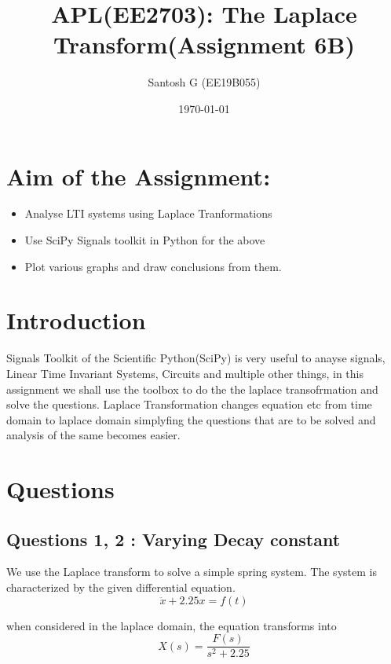 \documentclass[11pt, a4paper]{article}
\title{APL(EE2703): The Laplace Transform(Assignment 6B)} %
\author{Santosh G  (EE19B055)} %
\date{\today} %
\begin{document}
    \maketitle %

    \section{Aim of the Assignment:}   %
        \begin{itemize}
            \item Analyse LTI systems using Laplace Tranformations
            \item Use SciPy Signals toolkit in Python for the above
            \item Plot various graphs and draw conclusions from them.
        \end{itemize}
        
    \section{Introduction}
    Signals Toolkit of the Scientific Python(SciPy) is very useful to anayse signals, Linear Time Invariant Systems, Circuits and multiple other things, in this assignment we shall use the toolbox to do the the laplace transofrmation and solve the questions. Laplace Transformation changes equation etc from time domain to laplace domain simplyfing the questions that are to be solved and analysis of the same becomes easier.
       
        \section{Questions}
        \subsection{Questions 1, 2 : Varying Decay constant}
    	We use the Laplace transform to solve a simple spring system. The system is characterized by the given differential equation. 
    	\begin{equation}
    		\ddot{x} + 2.25x = f(t) 
    	\end{equation}
    	
    	
    	when considered in the laplace domain, the equation transforms into
    	\begin{equation}
    	  X(s) =  \frac{F(s)}{s^2+2.25}
    	\end{equation}
\end{document}
